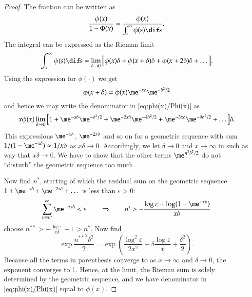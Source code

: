 \documentclass[a4paper]{article}
\numberwithin{equation}{subsection}
\begin{document}
\begin{proof}
  The fraction can be written as
  \begin{equation*}
    \frac{\phi(x)}{1 - \Phi(x)}
    =
    \frac{\phi(x)}{\int_{x}^{\infty} \phi(s) \dif s}.
  \end{equation*}
  The integral can be expressed as the Rieman limit
  \begin{equation*}
    \int_{x}^{\infty} \phi(s) \dif s
    =
    \lim_{\delta \to 0} 
    \big[
    \phi(x) \delta +
    \phi(x + \delta) \delta +
    \phi(x + 2 \delta) \delta +
    \dots 
    \big].
  \end{equation*}
  Using the expression for $\phi(\cdot)$ we get
  \begin{equation*}
    \phi(x + \delta) = \phi(x) \me^{-x \delta} \me^{-\delta^{2}/2}
  \end{equation*}
  and hence we may write the denominator in \eqref{eq:phi(x)/Phi(x)}
  as
  \begin{equation*}
    x \phi(x)
    \lim_{\delta \to 0} 
    \big[
    1 +
    \me^{-x \delta} \me^{-\delta^{2}/2} +
    \me^{-2 x \delta} \me^{-4 \delta^{2}/2} +
    \me^{-3 x \delta} \me^{-9 \delta^{2}/2} +
    \dots 
    \big] \delta.
  \end{equation*}
  This expressions $\me^{-x \delta}$, $\me^{-2 x \delta}$ and so on
  for a geometric sequence with sum $1/(1 - \me^{-x \delta}) \approx 1/x
  \delta$ as $x \delta \to 0$.  Accordingly, we let $\delta \to 0$ and $x
  \to \infty$ in such as way that $x \delta \to 0$.  We have to show
  that the other terms $\me^{n^{2} \delta^{2}/2}$ do not ``disturb''
  the geometric sequence too much.

  Now find $n^{*}$, starting of which the residual sum on the
  geometric sequence $1 + \me^{-x \delta} + \me^{-2 x \delta} + \dots$
  is less than $\varepsilon > 0$:
  \begin{equation*}
    \sum_{n=n^{*}}^{\infty} \me^{-n x \delta} < \varepsilon
    \qquad\Rightarrow\qquad
    n^{*} > -\frac{\log \varepsilon + \log(1 - \me^{-x \delta})}{x \delta}
  \end{equation*}
  choose $n^{**} > -\frac{\log \varepsilon}{x \delta} + 1 > n^{*}$.
  Now find 
  \begin{equation*}
    \exp\frac{{n^{**}}^{2} \delta^{2}}{2}
    =
    \exp\left(
      \frac{\log^{2}\varepsilon}{2 x^{2}}
      +
      \delta\frac{\log\varepsilon}{x}
      +
      \frac{\delta^{2}}{2}
    \right).
  \end{equation*}
  Because all the terms in parenthesis converge to as $x\to\infty$ and
  $\delta \to 0$, the exponent converges to 1.  Hence, at the limit, the
  Rieman sum is solely determined by the geometric sequence, and we
  have denominator in \eqref{eq:phi(x)/Phi(x)} equal to $\phi(x)$.
\end{proof}
\end{document}
